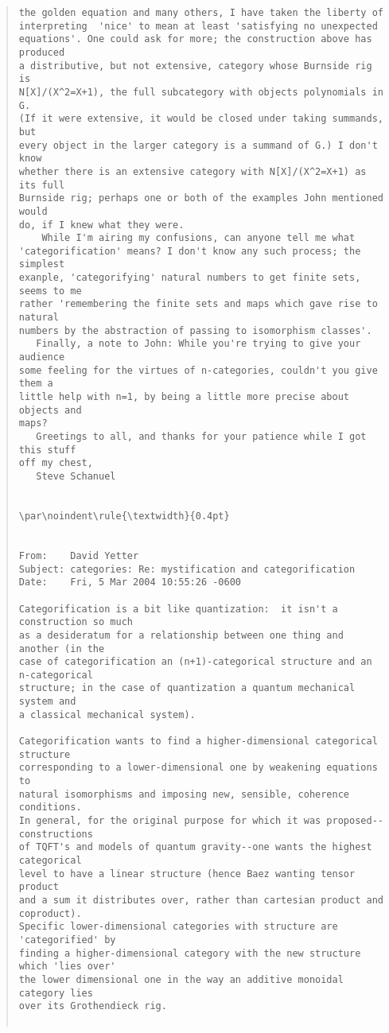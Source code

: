 \begin{quote}
\begin{verbatim}
the golden equation and many others, I have taken the liberty of
interpreting  'nice' to mean at least 'satisfying no unexpected
equations'. One could ask for more; the construction above has produced
a distributive, but not extensive, category whose Burnside rig is
N[X]/(X^2=X+1), the full subcategory with objects polynomials in G.
(If it were extensive, it would be closed under taking summands, but
every object in the larger category is a summand of G.) I don't know
whether there is an extensive category with N[X]/(X^2=X+1) as its full
Burnside rig; perhaps one or both of the examples John mentioned would
do, if I knew what they were.
    While I'm airing my confusions, can anyone tell me what
'categorification' means? I don't know any such process; the simplest
exanple, 'categorifying' natural numbers to get finite sets, seems to me
rather 'remembering the finite sets and maps which gave rise to natural
numbers by the abstraction of passing to isomorphism classes'.
   Finally, a note to John: While you're trying to give your audience
some feeling for the virtues of n-categories, couldn't you give them a
little help with n=1, by being a little more precise about objects and
maps?
   Greetings to all, and thanks for your patience while I got this stuff
off my chest,
   Steve Schanuel


\par\noindent\rule{\textwidth}{0.4pt}


From: 	 David Yetter 
Subject: categories: Re: mystification and categorification
Date: 	 Fri, 5 Mar 2004 10:55:26 -0600	

Categorification is a bit like quantization:  it isn't a construction so much
as a desideratum for a relationship between one thing and another (in the
case of categorification an (n+1)-categorical structure and an n-categorical
structure; in the case of quantization a quantum mechanical system and
a classical mechanical system).

Categorification wants to find a higher-dimensional categorical structure
corresponding to a lower-dimensional one by weakening equations to
natural isomorphisms and imposing new, sensible, coherence conditions.
In general, for the original purpose for which it was proposed--constructions
of TQFT's and models of quantum gravity--one wants the highest categorical
level to have a linear structure (hence Baez wanting tensor product
and a sum it distributes over, rather than cartesian product and coproduct).
Specific lower-dimensional categories with structure are 'categorified' by
finding a higher-dimensional category with the new structure which 'lies over'
the lower dimensional one in the way an additive monoidal category lies
over its Grothendieck rig.


\end{verbatim}
\end{quote}
